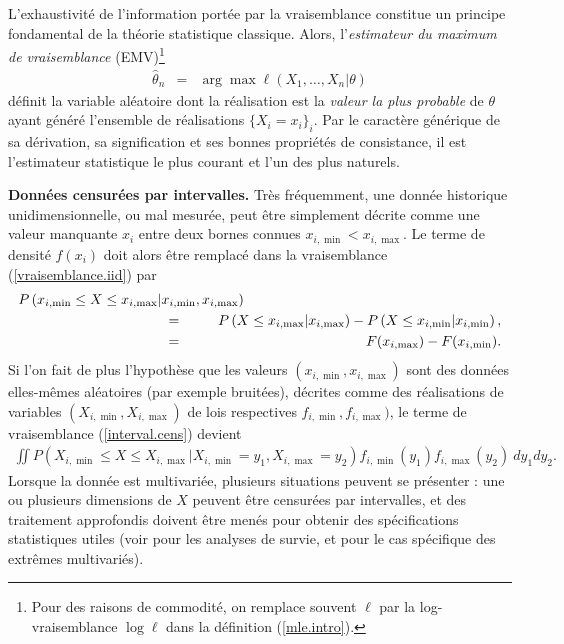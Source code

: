 L'exhaustivit\'e de l'information port\'ee par la vraisemblance constitue un principe fondamental de la th\'eorie statistique classique. Alors, l'{\it estimateur du maximum de vraisemblance}  (EMV)\footnote{Pour des raisons de commodit\'e, on remplace souvent $\ell$ par la log-vraisemblance  $\log\ell$ dans la d\'efinition (\ref{mle.intro}).}  \label{mle.page.ref}
\begin{eqnarray}
\hat{\theta}_n & = & \arg\max \ell(X_1,\ldots,X_n|\theta) \label{mle.intro}
\end{eqnarray}
d\'efinit la variable al\'eatoire dont la r\'ealisation est la {\it valeur la plus probable} de $\theta$ ayant g\'en\'er\'e l'ensemble de r\'ealisations $\{X_i=x_i\}_i$. Par le caract\`ere g\'en\'erique de sa d\'erivation, sa signification et ses bonnes propri\'et\'es de consistance, il est l'estimateur statistique le plus courant et l'un des plus naturels. \\

\begin{exo}\label{censure.intervalle}{\bf Donn\'ees censur\'ees par intervalles.}
\noindent Tr\`es fr\'equemment, une donn\'ee historique unidimensionnelle, ou mal mesur\'ee, peut \^etre simplement d\'ecrite comme une valeur manquante $x_i$ entre deux bornes connues $x_{i,\min}<x_{i,\max}$. Le terme de densit\'e $f(x_i)$ doit alors \^etre remplac\'e dans la vraisemblance (\ref{vraisemblance.iid}) par 
\begin{eqnarray}
P\left(x_{i,\min} \leq X \leq x_{i,\max} | x_{i,\min},x_{i,\max}\right) & & \\
& \hspace{-2cm} = & \hspace{-1cm} P\left(X \leq x_{i,\max} |x_{i,\max}\right) - P\left(X \leq x_{i,\min} |x_{i,\min}\right), \nonumber \\
& \hspace{-2cm} = & \hspace{-1cm} F(x_{i,\max})-F(x_{i,\min}). \label{interval.cens} 
\end{eqnarray}
Si l'on fait de plus l'hypoth\`ese que les valeurs $(x_{i,\min},x_{i,\max})$ sont des donn\'ees elles-m\^emes al\'eatoires (par exemple bruit\'ees), d\'ecrites comme des r\'ealisations de variables $(X_{i,\min},X_{i,\max})$ de lois respectives $f_{i,\min},f_{i,\max})$,  le terme de vraisemblance (\ref{interval.cens}) devient 
\begin{eqnarray*}
\iint P\left(X_{i,\min} \leq X \leq X_{i,\max} | X_{i,\min}=y_1,X_{i,\max}=y_2\right) f_{i,\min}(y_1) f_{i,\max}(y_2) \ dy_1 dy_2.
\end{eqnarray*}
Lorsque la donn\'ee est multivari\'ee, plusieurs situations peuvent se pr\'esenter : une ou plusieurs dimensions de $X$ peuvent \^etre censur\'ees par intervalles, et des traitement approfondis doivent \^etre men\'es pour obtenir des sp\'ecifications statistiques utiles (voir \cite{Kim2002a} pour les analyses de survie, et \cite{sabourin2015semi} pour le cas sp\'ecifique des extr\^emes multivari\'es). \\
\end{exo}

